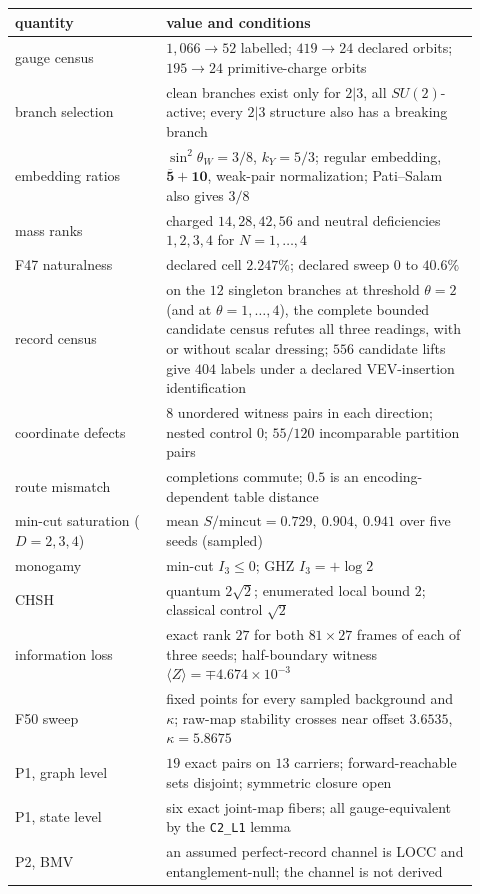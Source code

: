 \begin{center}
\small
\begin{longtable}[]{@{}p{0.3\linewidth}p{0.62\linewidth}@{}}
\toprule
quantity & value and conditions\\
\midrule
\endhead
gauge census & \(1{,}066\to52\) labelled; \(419\to24\) declared orbits; \(195\to24\) primitive-charge orbits\\
branch selection & clean branches exist only for \(2|3\), all \(SU(2)\)-active; every \(2|3\) structure also has a
breaking branch\\
embedding ratios & \(\sin^2\theta_W=3/8\), \(k_Y=5/3\); regular embedding, \(\overline{\mathbf5}+\mathbf{10}\), weak-pair
normalization; Pati--Salam also gives \(3/8\)\\
mass ranks & charged \(14,28,42,56\) and neutral deficiencies \(1,2,3,4\) for \(N=1,\dots,4\)\\
F47 naturalness & declared cell \(2.247\%\); declared sweep \(0\) to \(40.6\%\)\\
record census & on the \(12\) singleton branches at threshold \(\theta=2\) (and at \(\theta=1,\dots,4\)), the complete
bounded candidate census refutes all three readings, with or without scalar dressing; \(556\) candidate lifts give
\(404\) labels under a declared VEV-insertion identification\\
coordinate defects & \(8\) unordered witness pairs in each direction; nested control \(0\); \(55/120\) incomparable partition pairs\\
route mismatch & completions commute; \(0.5\) is an encoding-dependent table distance\\
min-cut saturation (\(D=2,3,4\)) & mean \(S/\mathrm{mincut}=0.729,\ 0.904,\ 0.941\) over five seeds (sampled)\\
monogamy & min-cut \(I_3\le0\); GHZ \(I_3=+\log2\)\\
CHSH & quantum \(2\sqrt2\); enumerated local bound \(2\); classical control \(\sqrt2\)\\
information loss & exact rank \(27\) for both \(81\times27\) frames of each of three seeds; half-boundary witness
\(\langle Z\rangle=\mp4.674\times10^{-3}\)\\
F50 sweep & fixed points for every sampled background and \(\kappa\); raw-map stability crosses near offset \(3.6535\),
\(\kappa=5.8675\)\\
P1, graph level & \(19\) exact pairs on \(13\) carriers; forward-reachable sets disjoint; symmetric closure open\\
P1, state level & six exact joint-map fibers; all gauge-equivalent by the \texttt{C2\_L1} lemma\\
P2, BMV & an assumed perfect-record channel is LOCC and entanglement-null; the channel is not derived\\
\bottomrule
\end{longtable}
\end{center}
